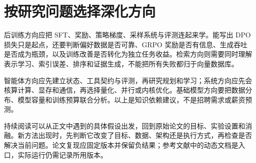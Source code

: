 \section{按研究问题选择深化方向}

后训练方向应把 SFT、奖励、策略梯度、采样系统与评测连起来学。能写出 DPO 损失只是起点，还要判断偏好数据是否可靠、GRPO 奖励是否有信息、生成吞吐是否成为瓶颈，以及训练改善是否转化为独立任务收益。检索方向则需要同时理解表示学习、索引误差、排序和证据生成，不能把所有失败都归于向量数据库。

智能体方向应先建立状态、工具契约与评测，再研究规划和学习；系统方向应先会核算计算、显存和通信，再选择量化、并行或内核优化。基础模型方向要把数据分布、模型容量和训练预算联合分析。以上是知识依赖建议，不是招聘需求或薪资预测。

持续阅读可以从正文中遇到的具体假设出发，回到原始论文的目标、实验设置和消融。新方法出现时，先判断它改变了目标、数据、架构还是执行方式，再检查是否解决当前问题。论文复现应固定版本并保留负结果；参考文献中的动态文档是入口，实际运行仍需记录所用版本。

